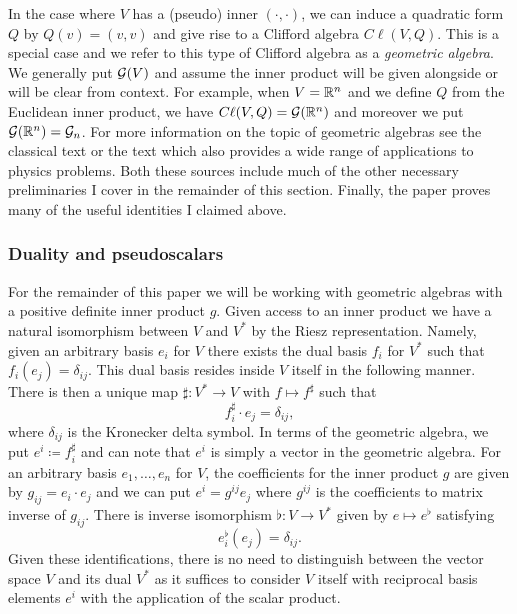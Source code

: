In the case where $V$ has a (pseudo) inner $(\cdot,\cdot)$, we can induce a quadratic form $Q$ by $Q(v)=(v,v)$ and give rise to a Clifford algebra $C\ell(V,Q)$.  This is a special case and we refer to this type of Clifford algebra as a \emph{geometric algebra}. We generally put $\mathcal{G}(V)$ and assume the inner product will be given alongside or will be clear from context.  For example, when $V=\mathbb{R}^n$ and we define $Q$ from the Euclidean inner product, we have $C\ell(V,Q)=\mathcal{G}(\mathbb{R}^n)$ and moreover we put $\mathcal{G}(\mathbb{R}^n)=\mathcal{G}_n$. For more information on the topic of geometric algebras see the classical text \cite{hestenes_clifford_1986} or the text \cite{doran_geometric_2003} which also provides a wide range of applications to physics problems. Both these sources include much of the other necessary preliminaries I cover in the remainder of this section. Finally, the paper \cite{chisolm_geometric_2012} proves many of the useful identities I claimed above.

\subsubsection{Duality and pseudoscalars}
\label{subsection:duality_and_pseudoscalars}

For the remainder of this paper we will be working with geometric algebras with a positive definite inner product $g$. Given access to an inner product we have a natural isomorphism between $V$ and $V^*$ by the Riesz representation.  Namely, given an arbitrary basis $e_i$ for $V$ there exists the dual basis $f_i$ for $V^*$ such that $f_i(e_j)=\delta_{ij}$.  This dual basis resides inside $V$ itself in the following manner. There is then a unique map $\sharp \colon V^* \to V$ with $f\mapsto f^\sharp$ such that
\[
f_i^\sharp \cdot e_j = \delta_{ij},
\]
where $\delta_{ij}$ is the Kronecker delta symbol. In terms of the geometric algebra, we put $e^i \coloneqq f_i^\sharp$ and can note that $e^i$ is simply a vector in the geometric algebra. For an arbitrary basis $e_1,\dots,e_n$ for $V$, the coefficients for the inner product $g$ are given by $g_{ij}=e_i\cdot e_j$ and we can put $e^i = g^{ij}e_j$ where $g^{ij}$ is the coefficients to matrix inverse of $g_{ij}$.  There is inverse isomorphism $\flat \colon V \to V^*$ given by $e \mapsto e^\flat$ satisfying
\[
e_i^\flat (e_j)= \delta_{ij}.
\]
Given these identifications, there is no need to distinguish between the vector space $V$ and its dual $V^*$ as it suffices to consider $V$ itself with reciprocal basis elements $e^i$ with the application of the scalar product.

